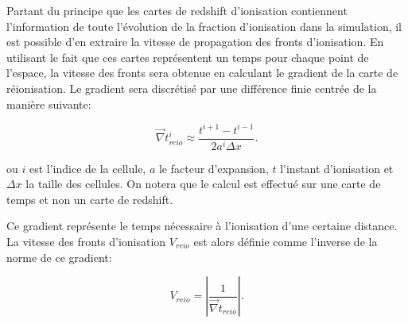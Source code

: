 Partant du principe que les cartes de redshift d'ionisation contiennent l'information de toute l'évolution de la fraction d'ionisation dans la simulation, il est possible d'en extraire la vitesse de propagation des fronts d'ionisation.
En utilisant le fait que ces cartes représentent un temps pour chaque point de l'espace, la vitesse des fronts sera obtenue en calculant le gradient de la carte de réionisation.
Le gradient sera discrétisé par une différence finie centrée de la manière suivante:

\begin{equation}
\vec{\nabla} t_{reio}^i \approx \frac{t^{i+1}  - t^{i-1}}{2a^i \Delta x }. %
\end{equation}

ou $i$ est l'indice de la cellule, $a$ le facteur d'expansion, $t$ l'instant d'ionisation et $\Delta x$ la taille des cellules.
On notera que le calcul est effectué sur une carte de temps et non un carte de redshift.

Ce gradient représente le temps nécessaire à l'ionisation d'une certaine distance.
La vitesse des fronts d'ionisation $V_{reio}$ est alors définie comme l'inverse de la norme de ce gradient:

\begin{equation}
V_{reio}  = \left | \frac{1}{ \vec{\nabla} t_{reio}} \right| .
\end{equation}

